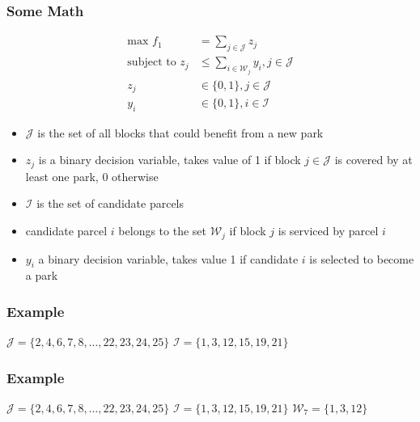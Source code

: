 \documentclass[10pt, compress]{beamer}
\begin{document}
\begin{frame}[fragile]
\frametitle{Some Math}
\begin{align*}
\textrm{max } f_1 &= \sum_{j \in \mathcal{J}} z_j \\
\textrm{subject to } z_j &\leq \sum_{i \in \mathcal{W}_j} y_i, j \in \mathcal{J}\\
z_j &\in \{0,1\}, j \in \mathcal{J} \\
y_i &\in \{0,1\}, i\in \mathcal{I}
\end{align*}
\begin{itemize}
\item $\mathcal{J}$ is the set of all blocks that could benefit from a new park 
\item $z_j$ is a binary decision variable, takes value of 1 if block $j \in \mathcal{J}$ is covered by at least one park, 0 otherwise
\item $\mathcal{I}$ is the set of candidate parcels
\item candidate parcel $i$ belongs to the set $\mathcal{W}_j$ if block $j$ is serviced by parcel $i$
\item $y_i$ a binary decision variable, takes value 1 if candidate $i$ is selected to become a park
\end{itemize}
\end{frame}

\begin{frame}[fragile]
  \frametitle{Example}
  \begin{center}
\end{center}
$\mathcal{J} = \{2,4,6,7,8,\dots, 22,23,24,25\}$ \newline
$\mathcal{I} = \{1,3,12,15,19,21\}$
\end{frame}

\begin{frame}[fragile]
  \frametitle{Example}
  \begin{center}
\end{center}
$\mathcal{J} = \{2,4,6,7,8,\dots, 22,23,24,25\}$ \newline
$\mathcal{I} = \{1,3,12,15,19,21\}$ \newline
$\mathcal{W}_7 = \{1,3,12\}$
\end{frame}
\end{document}
